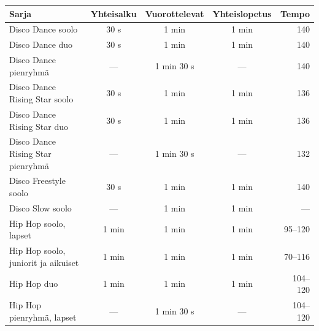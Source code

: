 \documentclass[12pt, a4paper, oneside]{article}
\begin{document}
\begin{table}[ht]
    \centering
    \setlength\tabcolsep{9pt}
    \small
    \renewcommand{\arraystretch}{1.5}
    \begin{tabular}{@{\hspace{0.25cm}}lcccr@{\hspace{0.25cm}}}
        \toprule
        \textbf{Sarja}                          & \textbf{Yhteisalku} & \textbf{Vuorottelevat} & \textbf{Yhteislopetus} & \textbf{Tempo} \\ \midrule
        Disco Dance soolo                       & 30 s                & 1 min                  & 1 min                  & 140            \\
        Disco Dance duo                         & 30 s                & 1 min                  & 1 min                  & 140            \\
        Disco Dance pienryhmä                   & ---                 & 1 min 30 s             & ---                    & 140            \\
        Disco Dance Rising Star soolo           & 30 s                & 1 min                  & 1 min                  & 136            \\
        Disco Dance Rising Star duo             & 30 s                & 1 min                  & 1 min                  & 136            \\
        Disco Dance Rising Star pienryhmä       & ---                 & 1 min 30 s             & ---                    & 132            \\
        Disco Freestyle soolo                   & 30 s                & 1 min                  & 1 min                  & 140            \\
        Disco Slow soolo                        & ---                 & 1 min                  & 1 min                  & ---            \\ \midrule
        Hip Hop soolo, lapset                   & 1 min               & 1 min                  & 1 min                  & 95--120        \\
        Hip Hop soolo, juniorit ja aikuiset     & 1 min               & 1 min                  & 1 min                  & 70--116        \\
        Hip Hop duo                             & 1 min               & 1 min                  & 1 min                  & 104--120       \\
        Hip Hop pienryhmä, lapset               & ---                 & 1 min 30 s             & ---                    & 104--120       \\

\end{tabular}
\end{table}
\end{document}
